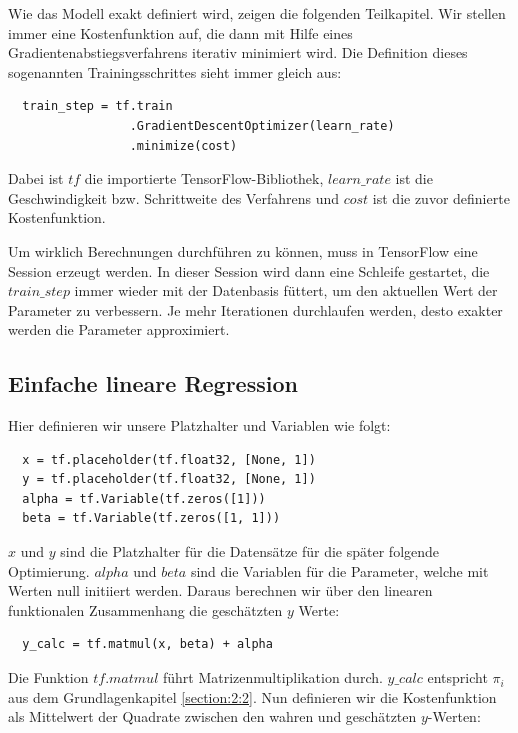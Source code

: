 Wie das Modell exakt definiert wird, zeigen die folgenden Teilkapitel. Wir stellen immer eine Kostenfunktion auf, die dann mit Hilfe eines Gradientenabstiegsverfahrens iterativ minimiert wird. Die Definition dieses sogenannten Trainingsschrittes sieht immer gleich aus:

\begin{verbatim}
  train_step = tf.train
                 .GradientDescentOptimizer(learn_rate)
                 .minimize(cost)
\end{verbatim}

Dabei ist $tf$ die importierte TensorFlow-Bibliothek, $learn\_rate$ ist die Geschwindigkeit bzw. Schrittweite des Verfahrens und $cost$ ist die zuvor definierte Kostenfunktion.

Um wirklich Berechnungen durchführen zu können, muss in TensorFlow eine Session erzeugt werden. In dieser Session wird dann eine Schleife gestartet, die $train\_step$ immer wieder mit der Datenbasis füttert, um den aktuellen Wert der Parameter zu verbessern. Je mehr Iterationen durchlaufen werden, desto exakter werden die Parameter approximiert.

\subsection{Einfache lineare Regression}
\label{subsection:3:3:2}

Hier definieren wir unsere Platzhalter und Variablen wie folgt:

\begin{verbatim}
  x = tf.placeholder(tf.float32, [None, 1])
  y = tf.placeholder(tf.float32, [None, 1])
  alpha = tf.Variable(tf.zeros([1]))
  beta = tf.Variable(tf.zeros([1, 1]))
\end{verbatim}

$x$ und $y$ sind die Platzhalter für die Datensätze für die später folgende Optimierung. $alpha$ und $beta$ sind die Variablen für die Parameter, welche mit Werten null initiiert werden. Daraus berechnen wir über den linearen funktionalen Zusammenhang die geschätzten $y$ Werte:

\begin{verbatim}
  y_calc = tf.matmul(x, beta) + alpha
\end{verbatim}

Die Funktion $tf.matmul$ führt Matrizenmultiplikation durch. $y\_calc$ entspricht $\pi_i$ aus dem Grundlagenkapitel \ref{section:2:2}. Nun definieren wir die Kostenfunktion als Mittelwert der Quadrate zwischen den wahren und geschätzten $y$-Werten:

